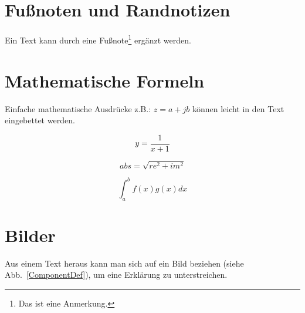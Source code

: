 \begin{appendix}
\newpage


\section{Fußnoten und Randnotizen}
Ein Text kann durch eine Fußnote\footnote{Das ist eine Anmerkung.} ergänzt
werden.


\newpage


\section{Mathematische Formeln}

Einfache mathematische Ausdrücke z.B.: $z=a+jb$ können leicht in den
Text eingebettet werden.

\begin{displaymath}
y=\frac{1}{x+1}
\end{displaymath}


\begin{displaymath}
abs = \sqrt{re^2 + im^2}
\end{displaymath}

\begin{displaymath}
\int_{a}^{b} f(x)g(x)dx
\end{displaymath}

\newpage


\section{Bilder}

Aus einem Text heraus kann man sich auf ein Bild beziehen (siehe
Abb.~\ref{ComponentDef}), um eine Erklärung zu unterstreichen.


\end{appendix}
